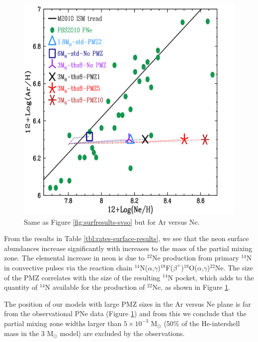 \begin{figure}
 \begin{center}\includegraphics[width=\columnwidth,height=0.75\columnwidth]{figures/surfresults-ArvsNe.pdf}\end{center}
 \caption{Same as Figure \ref{fig:surfresults-svso} but for Ar versus Ne.}\label{fig:surfresults-arvsne}
\end{figure}

From the results in Table \ref{tbl:rates-surface-results}, we see that the neon surface abundances increase significantly with increases to the mass of the partial mixing zone. The elemental increase in neon is due to $^{22}$Ne production from primary $^{14}$N in convective pulses via the reaction chain $^{14}$N($\alpha$,$\gamma$)$^{18}$F($\beta^+$)$^{18}$O($\alpha$,$\gamma$)$^{22}$Ne. The size of the PMZ correlates with the size of the resulting $^{14}$N pocket, which adds to the quantity of $^{14}$N available for the production of $^{22}$Ne, as shown in Figure \ref{fig:surfresults-arvsne}.

The position of our models with large PMZ sizes in the Ar versus Ne plane is far from the observational PNe data (Figure \ref{fig:surfresults-arvsne}) and from this we conclude that the partial mixing zone widths larger than $5 \times 10^{-3}$ M$_\odot$ (50\% of the He-intershell mass in the 3 M$_\odot$ model) are excluded by the observations.

